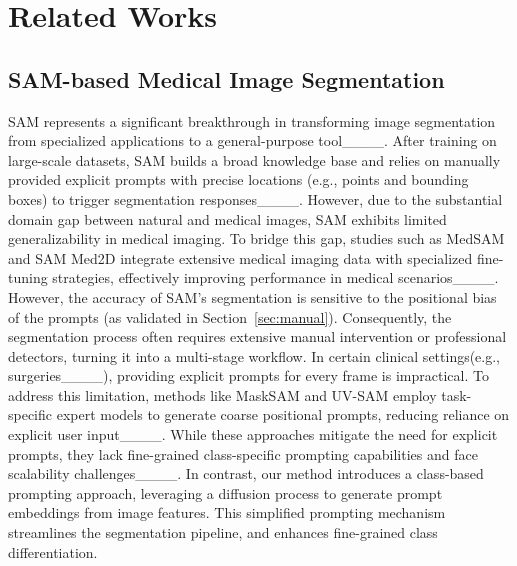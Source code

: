 \section{Related Works}
\subsection{SAM-based Medical Image Segmentation}
SAM represents a significant breakthrough in transforming image segmentation from specialized applications to a general-purpose tool____. 
After training on large-scale datasets, SAM builds a broad knowledge base and relies on manually provided explicit prompts with precise locations (e.g., points and bounding boxes) to trigger segmentation responses____. However, due to the substantial domain gap between natural and medical images, SAM exhibits limited generalizability in medical imaging. To bridge this gap, studies such as MedSAM and SAM Med2D integrate extensive medical imaging data with specialized fine-tuning strategies, effectively improving performance in medical scenarios____. However, the accuracy of SAM’s segmentation is sensitive to the positional bias of the prompts (as validated in Section~\ref{sec:manual}). Consequently, the segmentation process often requires extensive manual intervention or professional detectors, turning it into a multi-stage workflow. In certain clinical settings(e.g., surgeries____), providing explicit prompts for every frame is impractical. To address this limitation, methods like MaskSAM and UV-SAM employ task-specific expert models to generate coarse positional prompts, reducing reliance on explicit user input____. While these approaches mitigate the need for explicit prompts, they lack fine-grained class-specific prompting capabilities and face scalability challenges____. In contrast, our method introduces a class-based prompting approach, leveraging a diffusion process to generate prompt embeddings from image features. This simplified prompting mechanism streamlines the segmentation pipeline, and enhances fine-grained class differentiation.


